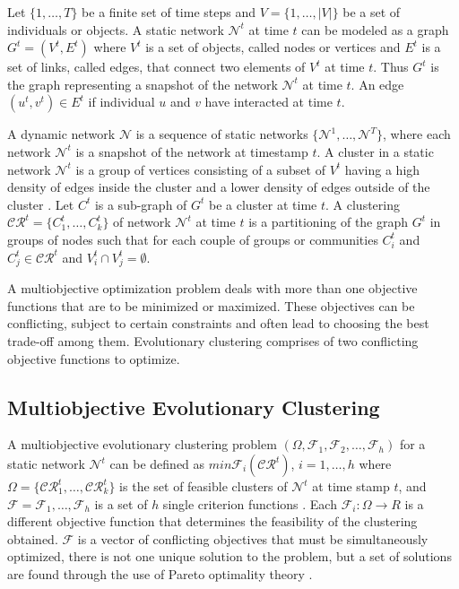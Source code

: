 \documentclass[12pt]{arsubmit}
\begin{document}
Let  $\{1,\ldots,T\}$ be a finite set of time steps and $V = \{1,\ldots,|V|\}$ be a set of individuals or objects. A static network $\mathcal{N}^t$ at time $t$ can be modeled as a graph $G^t = (V^t,E^t)$ where $V^t$ is a set of objects, called nodes or vertices and $E^t$ is a set of links, called edges, that connect two elements of $V^t$ at time $t$. Thus $G^t$ is the graph representing a snapshot of the network $\mathcal{N}^t$ at time $t$. An edge $(u^t, v^t)\in E^t$ if individual $u$ and $v$ have interacted at time $t$.

A dynamic network $\mathcal{N}$ is a sequence of static networks $\{\mathcal{N}^1,\ldots,\mathcal{N}^T\}$, where each network $\mathcal{N}^t$ is a snapshot of the network at timestamp $t$. A cluster in a static network $\mathcal{N}^t$ is a group of vertices consisting of a subset of $V^t$ having a high density of edges inside the cluster and a lower density of edges outside of the cluster \cite{dynmoga}. Let $C^t$ is a sub-graph of $G^t$ be a cluster at time $t$. A clustering $\mathcal{CR}^t = \{C_1^t,\ldots,C_k^t\}$ of network $\mathcal{N}^t$ at time $t$ is a partitioning of the graph $G^t$ in groups of nodes such that for each couple of groups or communities $C_i^t$ and $C_j^t \in  \mathcal{CR}^t$ and $V_i^t \cap V_j^t = \emptyset$.

A multiobjective optimization problem deals with more than one objective functions that are to be minimized or maximized. These objectives can be conflicting, subject to certain constraints and often lead to choosing the best trade-off among them. Evolutionary clustering comprises of two conflicting objective functions to optimize.

\subsection{Multiobjective Evolutionary Clustering}

A multiobjective evolutionary clustering problem $(\Omega,\mathcal{F}_1,\mathcal{F}_2,\ldots,\mathcal{F}_h)$ for a static network $\mathcal{N}^t$ can be defined as $min \mathcal{F}_i(\mathcal{CR}^t)$, $i = 1,\ldots,h$ where $\Omega = \{\mathcal{CR}_1^t,\ldots,\mathcal{CR}_k^t\}$ is the set of feasible clusters of $\mathcal{N}^t$ at time stamp $t$, and $\mathcal{F} = {\mathcal{F}_1,\ldots,\mathcal{F}_h}$ is a set of $h$ single criterion functions \cite{dynmoga}. Each $\mathcal{F}_i\colon \Omega \rightarrow R$ is a different objective function that determines the feasibility of the clustering obtained. $\mathcal{F}$ is a vector of conflicting objectives that must be simultaneously optimized, there is not one unique solution to the problem, but a set of solutions are found through the use of Pareto optimality theory \cite{dynmoga9}. 
\end{document}
